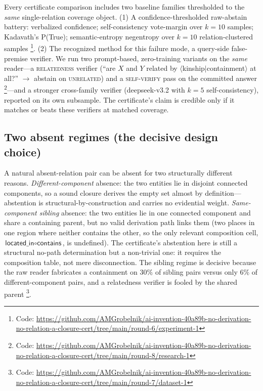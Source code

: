 \documentclass[11pt,letterpaper]{article}
\begin{document}
Every certificate comparison includes two baseline families thresholded to the \emph{same} single-relation coverage object. (1) A confidence-thresholded raw-abstain battery: verbalized confidence; self-consistency vote-margin over $k{=}10$ samples; Kadavath's P(True); semantic-entropy negentropy over $k{=}10$ relation-clustered samples \footnote{Code: \url{https://github.com/AMGrobelnik/ai-invention-40a89b-no-derivation-no-relation-a-closure-cert/tree/main/round-6/experiment-1}}. (2) The recognized method for this failure mode, a query-side false-premise verifier. We run two prompt-based, zero-training variants on the \emph{same} reader---a \textsc{relatedness} verifier (``are $X$ and $Y$ related by $\langle$kinship$|$containment$\rangle$ at all?'' $\rightarrow$ abstain on \textsc{unrelated}) and a \textsc{self-verify} pass on the committed answer \footnote{Code: \url{https://github.com/AMGrobelnik/ai-invention-40a89b-no-derivation-no-relation-a-closure-cert/tree/main/round-8/research-1}}---and a stronger cross-family verifier (deepseek-v3.2 with $k{=}5$ self-consistency), reported on its own subsample. The certificate's claim is credible only if it matches or beats these verifiers at matched coverage.

\subsection{Two absent regimes (the decisive design choice)}

A natural absent-relation pair can be absent for two structurally different reasons. \emph{Different-component} absence: the two entities lie in disjoint connected components, so a sound closure derives the empty set almost by definition---abstention is structural-by-construction and carries no evidential weight. \emph{Same-component sibling} absence: the two entities lie in one connected component and share a containing parent, but no valid derivation path links them (two places in one region where neither contains the other, so the only relevant composition cell, $\textsf{located\_in}\circ\textsf{contains}$, is undefined). The certificate's abstention here is still a structural no-path determination but a non-trivial one: it requires the composition table, not mere disconnection. The sibling regime is decisive because the raw reader fabricates a containment on $30\%$ of sibling pairs versus only $6\%$ of different-component pairs, and a relatedness verifier is fooled by the shared parent \footnote{Code: \url{https://github.com/AMGrobelnik/ai-invention-40a89b-no-derivation-no-relation-a-closure-cert/tree/main/round-7/dataset-1}}.
\end{document}
